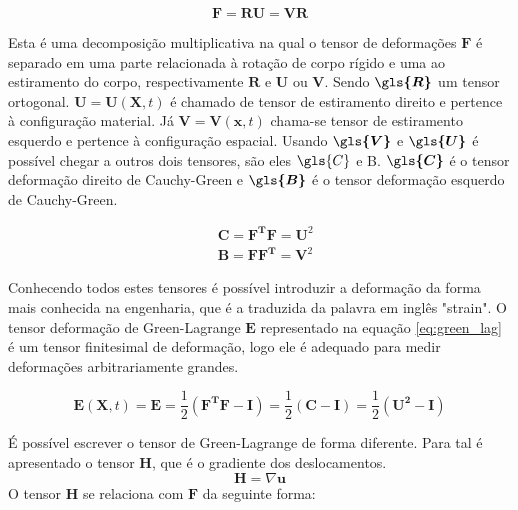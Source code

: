 \begin{equation}
    \boldsymbol F = \boldsymbol{RU} = \boldsymbol{VR}
\end{equation}

Esta é uma decomposição multiplicativa na qual o tensor de deformações $ \boldsymbol{F} $ é separado em uma parte relacionada à rotação de corpo rígido e uma ao estiramento do corpo, respectivamente $ \boldsymbol{R} $ e $ \boldsymbol{U} $ ou $ \boldsymbol{V} $. Sendo $ \boldsymbol{\gls{R}}$ um tensor ortogonal. $ \boldsymbol U = \boldsymbol{U}(\boldsymbol{X},t) $ é chamado de tensor de estiramento direito e pertence à configuração material. Já $ \boldsymbol V = \boldsymbol{V}(\boldsymbol{x},t) $ chama-se tensor de estiramento esquerdo e pertence à configuração espacial. Usando $ \boldsymbol{\gls{V}} $  e $ \boldsymbol{\gls{U}} $ é possível chegar a outros dois tensores, são eles $ \gls{C}$ e \gls{B}. $ \boldsymbol{\gls{C}} $ é o tensor deformação direito de Cauchy-Green e $ \boldsymbol{\gls{B}} $ é o tensor deformação esquerdo de Cauchy-Green. 

\begin{align}
    & \boldsymbol{C} = \boldsymbol{F^TF} = \boldsymbol{U}^2 \\
    & \boldsymbol{B} = \boldsymbol{FF^T} = \boldsymbol{V}^2
\end{align}

Conhecendo todos estes tensores é possível introduzir a deformação da forma mais conhecida na engenharia, que é a traduzida da palavra em inglês "strain". O tensor deformação de Green-Lagrange $ \boldsymbol{E} $ representado na equação \ref{eq:green_lag} é um tensor finitesimal de deformação, logo ele é adequado para medir deformações arbitrariamente grandes.

\begin{equation}
   \boldsymbol{E}(\boldsymbol{X},t) =  \boldsymbol{E} = \frac{1}{2}(\boldsymbol{F^TF - I}) = \frac{1}{2}(\boldsymbol{C - I}) = \frac{1}{2}(\boldsymbol{U^2 - I})
    \label{eq:green_lag}
\end{equation}

É possível escrever o tensor de Green-Lagrange de forma diferente. Para tal é apresentado o tensor $\boldsymbol{H}$, que é o gradiente dos deslocamentos.
\begin{equation}
    \boldsymbol{H} = \nabla \boldsymbol{u}
    \label{eq:desl_gradH}
\end{equation}
O tensor $ \boldsymbol{H} $ se relaciona com $ \boldsymbol{F} $ da seguinte forma:

